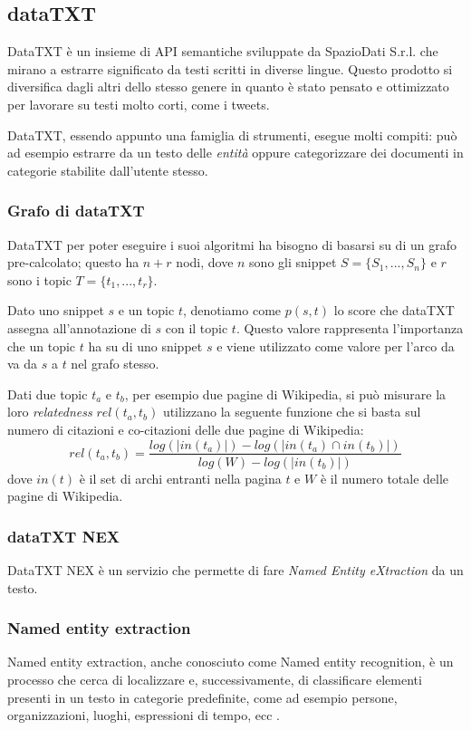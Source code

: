 \subsection{dataTXT}
DataTXT è un insieme di API semantiche sviluppate da SpazioDati S.r.l. che mirano a estrarre significato da testi scritti in diverse lingue. Questo prodotto si diversifica dagli altri dello stesso genere in quanto è stato pensato e ottimizzato per lavorare su testi molto corti, come i tweets.

DataTXT, essendo appunto una famiglia di strumenti, esegue molti compiti: può ad esempio estrarre da un testo delle \emph{entità} oppure categorizzare dei documenti in categorie stabilite dall'utente stesso.

\subsubsection{Grafo di dataTXT}
	DataTXT per poter eseguire i suoi algoritmi ha bisogno di basarsi su di un grafo pre-calcolato; questo ha $n+r$ nodi, dove $n$ sono gli snippet $S =  \{S_1, ..., S_n\}$ e $r$ sono i topic $T = \{t_1, ..., t_r\}$. 

Dato uno snippet $s$ e un topic $t$, denotiamo come $p(s,t)$ lo score che dataTXT assegna all'annotazione di $s$ con il topic $t$. Questo valore rappresenta l'importanza che un topic $t$ ha su di uno snippet $s$ e viene utilizzato come valore per l'arco da va da $s$ a $t$ nel grafo stesso.

	Dati due topic $t_a$ e $t_b$, per esempio due pagine di Wikipedia, si può misurare la loro \emph{relatedness} $rel(t_a, t_b)$ utilizzano la seguente funzione che si basta sul numero di citazioni e co-citazioni delle due pagine di Wikipedia:
	\begin{equation*}
	  rel(t_a, t_b) = \frac{log(| in(t_a) |) - log(| in(t_a) \cap in(t_b)|)}{log(W) - log(|in(t_b)|)}
	\end{equation*}
	dove $in(t)$ è il set di archi entranti nella pagina $t$ e $W$ è il numero totale delle pagine di Wikipedia\cite{datatxt_graph}.

\subsubsection{dataTXT NEX}
	DataTXT NEX è un servizio che permette di fare \emph{Named Entity eXtraction} da un 	testo. 

	\subsubsection{Named entity extraction}
		Named entity extraction, anche conosciuto come Named entity recognition, è un processo che cerca di localizzare e, successivamente, di classificare elementi presenti in un testo in categorie predefinite, come ad esempio persone, organizzazioni, luoghi, espressioni di tempo, ecc \cite{named_enitity_extraction}.

